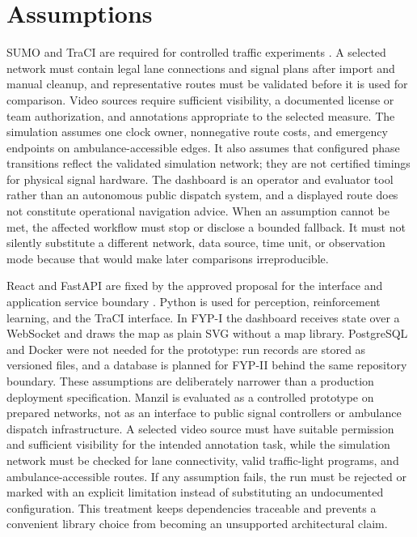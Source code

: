 \section{Assumptions}

SUMO and TraCI are required for controlled traffic experiments \cite{lopez2018sumo,sumodocs}. A selected network must contain legal lane connections and signal plans after import and manual cleanup, and representative routes must be validated before it is used for comparison. Video sources require sufficient visibility, a documented license or team authorization, and annotations appropriate to the selected measure. The simulation assumes one clock owner, nonnegative route costs, and emergency endpoints on ambulance-accessible edges. It also assumes that configured phase transitions reflect the validated simulation network; they are not certified timings for physical signal hardware. The dashboard is an operator and evaluator tool rather than an autonomous public dispatch system, and a displayed route does not constitute operational navigation advice. When an assumption cannot be met, the affected workflow must stop or disclose a bounded fallback. It must not silently substitute a different network, data source, time unit, or observation mode because that would make later comparisons irreproducible.

React and FastAPI are fixed by the approved proposal for the interface and application service boundary \cite{reactdocs,fastapidocs}. Python is used for perception, reinforcement learning, and the TraCI interface. In FYP-I the dashboard receives state over a WebSocket and draws the map as plain SVG without a map library. PostgreSQL and Docker were not needed for the prototype: run records are stored as versioned files, and a database is planned for FYP-II behind the same repository boundary. These assumptions are deliberately narrower than a production deployment specification. Manzil is evaluated as a controlled prototype on prepared networks, not as an interface to public signal controllers or ambulance dispatch infrastructure. A selected video source must have suitable permission and sufficient visibility for the intended annotation task, while the simulation network must be checked for lane connectivity, valid traffic-light programs, and ambulance-accessible routes. If any assumption fails, the run must be rejected or marked with an explicit limitation instead of substituting an undocumented configuration. This treatment keeps dependencies traceable and prevents a convenient library choice from becoming an unsupported architectural claim.

